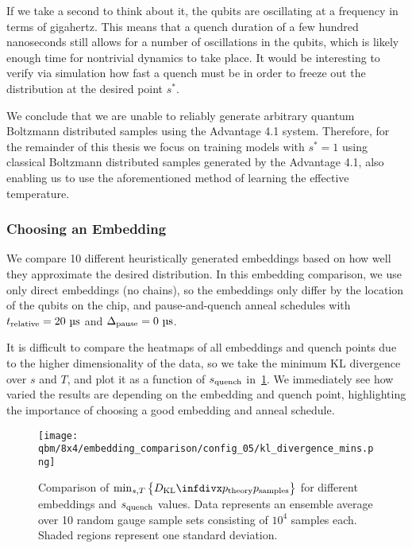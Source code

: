 If we take a second to think about it, the qubits are oscillating at a frequency in terms of gigahertz.
This means that a quench duration of a few hundred nanoseconds still allows for a number of oscillations in the qubits, which is likely enough time for nontrivial dynamics to take place.
It would be interesting to verify via simulation how fast a quench must be in order to freeze out the distribution at the desired point \( s^* \).

We conclude that we are unable to reliably generate arbitrary quantum Boltzmann distributed samples using the Advantage 4.1 system.
Therefore, for the remainder of this thesis we focus on training models with \( s^* = 1 \) using classical Boltzmann distributed samples generated by the Advantage 4.1, also enabling us to use the aforementioned method of learning the effective temperature.

\subsubsection{Choosing an Embedding}
We compare 10 different heuristically generated embeddings based on how well they approximate the desired distribution.
In this embedding comparison, we use only direct embeddings (no chains), so the embeddings only differ by the location of the qubits on the chip, and pause-and-quench anneal schedules with \( t_{\text{relative}} = 20 \ \si{\micro\second} \) and \( \Deltapause = 0 \ \si{\micro\second} \).

It is difficult to compare the heatmaps of all embeddings and quench points due to the higher dimensionality of the data, so we take the minimum KL divergence over \( s \) and \( T \), and plot it as a function of \( s_{\text{quench}} \) in~\cref{fig:dkl_mins_embeddings}.
We immediately see how varied the results are depending on the embedding and quench point, highlighting the importance of choosing a good embedding and anneal schedule.

\begin{figure}[!htb]
    \begin{center}
        \texttt{[image: qbm/8x4/embedding\_comparison/config\_05/kl\_divergence\_mins.png]}
    \end{center}
    \caption{
        Comparison of \( \min_{s,T}\big\{\DKL{\ptheory}{\psamples}\big\} \) for different embeddings and \( s_{\text{quench}} \) values.
        Data represents an ensemble average over 10 random gauge sample sets consisting of \( 10^4 \) samples each.
        Shaded regions represent one standard deviation.
    }
    \label{fig:dkl_mins_embeddings}
\end{figure}

